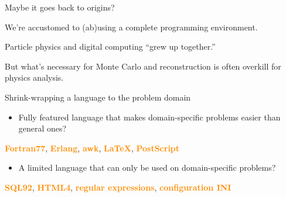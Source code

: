 \documentclass[aspectratio=169]{beamer}
\begin{document}
\begin{frame}{Maybe it goes back to origins?}
\large
\vspace{0.5 cm}

We're accustomed to (ab)using a complete programming environment.

\vspace{0.5 cm}
Particle physics and digital computing ``grew up together.''

\vspace{1 cm}
But what's necessary for Monte Carlo and reconstruction is often overkill for physics analysis.
\end{frame}

\begin{frame}{Shrink-wrapping a language to the problem domain}
\large
\begin{itemize}
\item Fully featured language that makes domain-specific problems easier than general ones?
\end{itemize}

\begin{center}
\textcolor{darkorange}{\bf Fortran77}, \textcolor{darkorange}{\bf Erlang}, \textcolor{darkorange}{\bf awk}, \textcolor{darkorange}{\bf \LaTeX}, \textcolor{darkorange}{\bf PostScript}
\end{center}

\begin{itemize}
\item A limited language that can only be used on domain-specific problems?
\end{itemize}

\begin{center}
\textcolor{darkorange}{\bf SQL92}, \textcolor{darkorange}{\bf HTML4}, \textcolor{darkorange}{\bf regular expressions}, \textcolor{darkorange}{\bf configuration INI}
\end{center}
\end{frame}
\end{document}
